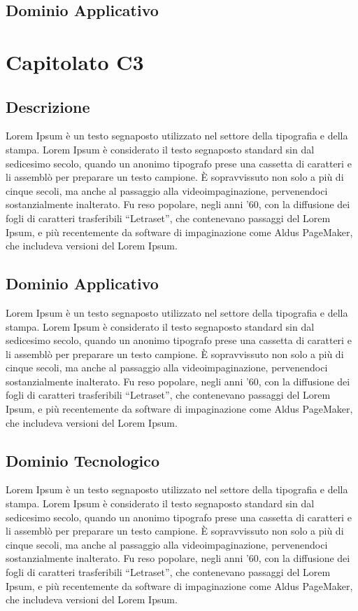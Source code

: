 \subsection{Dominio Applicativo}
\section{Capitolato C3}
\subsection{Descrizione}
Lorem Ipsum è un testo segnaposto utilizzato nel settore della tipografia e della stampa. Lorem Ipsum è considerato il testo segnaposto standard sin dal sedicesimo secolo, quando un anonimo tipografo prese una cassetta di caratteri e li assemblò per preparare un testo campione. È sopravvissuto non solo a più di cinque secoli, ma anche al passaggio alla videoimpaginazione, pervenendoci sostanzialmente inalterato. Fu reso popolare, negli anni ’60, con la diffusione dei fogli di caratteri trasferibili “Letraset”, che contenevano passaggi del Lorem Ipsum, e più recentemente da software di impaginazione come Aldus PageMaker, che includeva versioni del Lorem Ipsum.

\subsection{Dominio Applicativo}
Lorem Ipsum è un testo segnaposto utilizzato nel settore della tipografia e della stampa. Lorem Ipsum è considerato il testo segnaposto standard sin dal sedicesimo secolo, quando un anonimo tipografo prese una cassetta di caratteri e li assemblò per preparare un testo campione. È sopravvissuto non solo a più di cinque secoli, ma anche al passaggio alla videoimpaginazione, pervenendoci sostanzialmente inalterato. Fu reso popolare, negli anni ’60, con la diffusione dei fogli di caratteri trasferibili “Letraset”, che contenevano passaggi del Lorem Ipsum, e più recentemente da software di impaginazione come Aldus PageMaker, che includeva versioni del Lorem Ipsum.

\subsection{Dominio Tecnologico}
Lorem Ipsum è un testo segnaposto utilizzato nel settore della tipografia e della stampa. Lorem Ipsum è considerato il testo segnaposto standard sin dal sedicesimo secolo, quando un anonimo tipografo prese una cassetta di caratteri e li assemblò per preparare un testo campione. È sopravvissuto non solo a più di cinque secoli, ma anche al passaggio alla videoimpaginazione, pervenendoci sostanzialmente inalterato. Fu reso popolare, negli anni ’60, con la diffusione dei fogli di caratteri trasferibili “Letraset”, che contenevano passaggi del Lorem Ipsum, e più recentemente da software di impaginazione come Aldus PageMaker, che includeva versioni del Lorem Ipsum.

